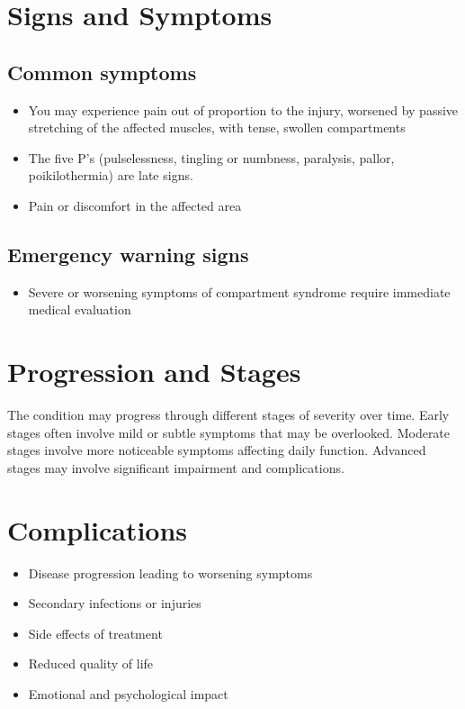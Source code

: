 \section{Signs and Symptoms}

\subsection{Common symptoms}
\begin{itemize}[noitemsep]
  \item You may experience pain out of proportion to the injury, worsened by passive stretching of the affected muscles, with tense, swollen compartments
  \item The five P's (pulselessness, tingling or numbness, paralysis, pallor, poikilothermia) are late signs.
  \item Pain or discomfort in the affected area
  \end{itemize}

\subsection{Emergency warning signs}
\begin{itemize}[noitemsep]
  \item Severe or worsening symptoms of compartment syndrome require immediate medical evaluation
\end{itemize}
\section{Progression and Stages}
The condition may progress through different stages of severity over time. Early stages often involve mild or subtle symptoms that may be overlooked. Moderate stages involve more noticeable symptoms affecting daily function. Advanced stages may involve significant impairment and complications.
\section{Complications}
\begin{itemize}[noitemsep]
  \item Disease progression leading to worsening symptoms
  \item Secondary infections or injuries
  \item Side effects of treatment
  \item Reduced quality of life
  \item Emotional and psychological impact
\end{itemize}
